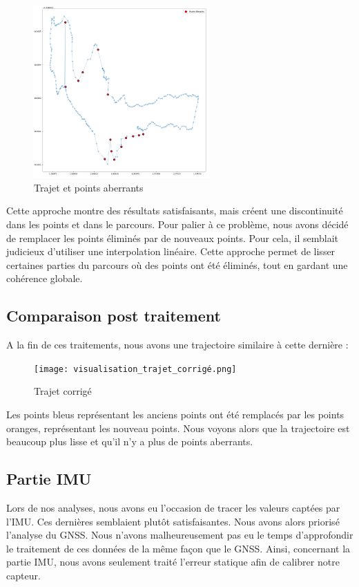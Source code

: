 \begin{figure}[H]
    \centering
    \includegraphics[width=0.6\textwidth]{visualisation_trajet_points_aberants.png} %
    \caption{Trajet et points aberrants}
    \label{fig:Trajet et points aberrants}
\end{figure}

Cette approche montre des résultats satisfaisants, mais créent une discontinuité dans les points et dans le parcours. Pour palier à ce problème, nous avons décidé de remplacer les points éliminés par de nouveaux points. Pour cela, il semblait judicieux d'utiliser une interpolation linéaire. Cette approche permet de lisser certaines parties du parcours où des points ont été éliminés, tout en gardant une cohérence globale. \\

\subsection*{Comparaison post traitement}

A la fin de ces traitements, nous avons une trajectoire similaire à cette dernière :

\begin{figure}[H]
    \centering
    \texttt{[image: visualisation\_trajet\_corrigé.png]} %
    \caption{Trajet corrigé}
    \label{fig:Trajet corrigé}
\end{figure}

Les points bleus représentant les anciens points ont été remplacés par les points oranges, représentant les nouveau points. Nous voyons alors que la trajectoire est beaucoup plus lisse et qu'il n'y a plus de points aberrants.

\subsection{Partie IMU}
Lors de nos analyses, nous avons eu l'occasion de tracer les valeurs captées par l'IMU. Ces dernières semblaient plutôt satisfaisantes. Nous avons alors priorisé l'analyse du GNSS. Nous n'avons malheureusement pas eu le temps d'approfondir le traitement de ces données de la même façon que le GNSS. Ainsi, concernant la partie IMU, nous avons seulement traité l'erreur statique afin de calibrer notre capteur.\\

